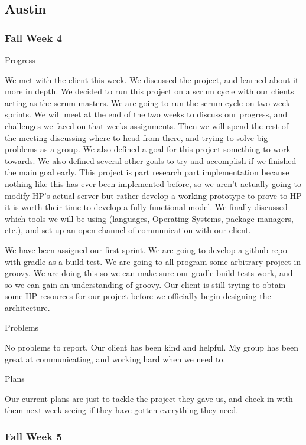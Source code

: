 \documentclass[onecolumn, draftclsnofoot,10pt, compsoc]{IEEEtran}
\begin{document}
\subsection{Austin}
\subsubsection*{Fall Week 4}

Progress

We met with the client this week. We discussed the project, and learned about it more in depth. We decided to run this project on a scrum cycle with our clients acting as the scrum masters. We are going to run the scrum cycle on two week sprints. We will meet at the end of the two weeks to discuss our progress, and challenges we faced on that weeks assignments. Then we will spend the rest of the meeting discussing where to head from there, and trying to solve big problems as a group. We also defined a goal for this project something to work towards. We also defined several other goals to try and accomplish if we finished the main goal early. This project is part research part implementation because nothing like this has ever been implemented before, so we aren't actually going to modify HP's actual server but rather develop a working prototype to prove to HP it is worth their time to develop a fully functional model. We finally discussed which tools we will be using (languages, Operating Systems, package managers, etc.), and set up an open channel of communication with our client.

We have been assigned our first sprint. We are going to develop a github repo with gradle as a build test. We are going to all program some arbitrary project in groovy. We are doing this so we can make sure our gradle build tests work, and so we can gain an understanding of groovy. Our client is still trying to obtain some HP resources for our project before we officially begin designing the architecture.

Problems

No problems to report. Our client has been kind and helpful. My group has been great at communicating, and working hard when we need to.

Plans

Our current plans are just to tackle the project they gave us, and check in with them next week seeing if they have gotten everything they need.

\subsubsection*{Fall Week 5}
\end{document}
